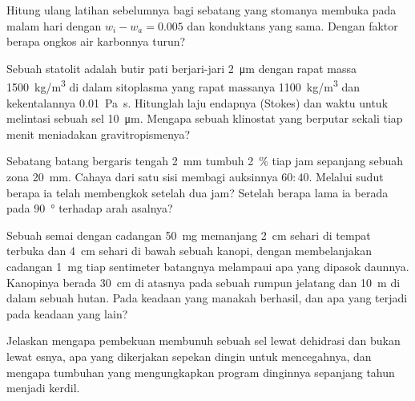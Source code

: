 \begin{exercise}[$\star\star$]\label{exo:b2:plant-plasticity:7}
Hitung ulang latihan sebelumnya bagi sebatang  yang
stomanya membuka pada malam hari dengan $w_i - w_a = 0.005$ dan
konduktans yang sama. Dengan faktor berapa ongkos air karbonnya turun?
\end{exercise}

\begin{exercise}[$\star\star$]\label{exo:b2:plant-plasticity:8}
Sebuah statolit adalah butir pati berjari-jari \qty{2}{\micro m} dengan
rapat massa \qty{1500}{kg/m^3} di dalam sitoplasma yang rapat massanya
\qty{1100}{kg/m^3} dan kekentalannya \qty{0.01}{Pa.s}. Hitunglah laju
endapnya (Stokes) dan waktu untuk melintasi sebuah sel
\qty{10}{\micro m}. Mengapa sebuah klinostat yang berputar sekali tiap
menit meniadakan gravitropismenya?
\end{exercise}

\begin{exercise}[$\star\star$]\label{exo:b2:plant-plasticity:9}
Sebatang batang bergaris tengah \qty{2}{mm} tumbuh \qty{2}{\%} tiap jam
sepanjang sebuah zona \qty{20}{mm}. Cahaya dari satu sisi membagi
auksinnya $60 : 40$. Melalui sudut berapa ia telah membengkok setelah
dua jam? Setelah berapa lama ia berada pada \qty{90}{\degree} terhadap arah asalnya?
\end{exercise}

\begin{exercise}[$\star\star\star$]\label{exo:b2:plant-plasticity:10}
Sebuah semai dengan cadangan \qty{50}{mg} memanjang \qty{2}{cm} sehari
di tempat terbuka dan \qty{4}{cm} sehari di bawah sebuah kanopi, dengan
membelanjakan cadangan \qty{1}{mg} tiap sentimeter batangnya melampaui
apa yang dipasok daunnya. Kanopinya berada \qty{30}{cm} di atasnya pada
sebuah rumpun jelatang dan \qty{10}{m} di dalam sebuah hutan. Pada
keadaan yang manakah  berhasil, dan apa yang terjadi pada keadaan yang lain?
\end{exercise}

\begin{exercise}[$\star\star\star$]\label{exo:b2:plant-plasticity:11}
Jelaskan mengapa pembekuan membunuh sebuah sel lewat dehidrasi dan
bukan lewat esnya, apa yang dikerjakan sepekan dingin untuk
mencegahnya, dan mengapa tumbuhan yang mengungkapkan program dinginnya
sepanjang tahun menjadi kerdil.
\end{exercise}

